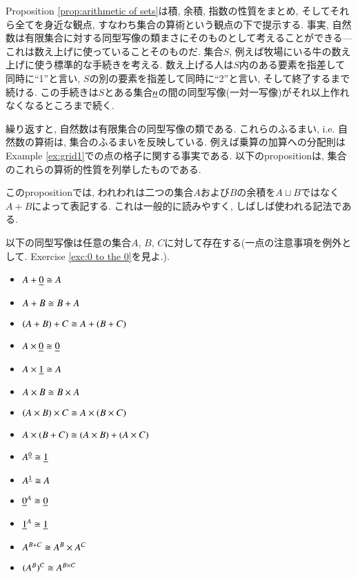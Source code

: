Proposition \ref{prop:arithmetic of sets}は積, 余積, 指数の性質をまとめ, そしてそれら全てを身近な観点, すなわち集合の算術という観点の下で提示する. 事実, 自然数は有限集合に対する同型写像の類まさにそのものとして考えることができる---これは数え上げに使っていることそのものだ. 集合$S$, 例えば牧場にいる牛の数え上げに使う標準的な手続きを考える. 数え上げる人は$S$内のある要素を指差して同時に``1''と言い, $S$の別の要素を指差して同時に``2''と言い, そして終了するまで続ける. この手続きは$S$とある集合$\underline{n}$の間の同型写像(一対一写像)がそれ以上作れなくなるところまで続く. 


繰り返すと, 自然数は有限集合の同型写像の類である. これらのふるまい, i.e. 自然数の算術は, 集合のふるまいを反映している. 例えば乗算の加算への分配則はExample \ref{ex:grid1}での点の格子に関する事実である. 以下のpropositionは, 集合のこれらの算術的性質を列挙したものである.


このpropositionでは, われわれは二つの集合$A$および$B$の余積を$A\sqcup B$ではなく$A+B$によって表記する. これは一般的に読みやすく, しばしば使われる記法である.

\begin{proposition}\label{prop:arithmetic of sets}

以下の同型写像は任意の集合$A$, $B$, $C$に対して存在する(一点の注意事項を例外として. Exercise \ref{exc:0 to the 0}を見よ.).
\begin{itemize}
\item $A+\underline{0}\cong A$
\item $A + B\cong B + A$
\item $(A + B) + C \cong A + (B + C)$
\item $A\times\underline{0}\cong\underline{0}$
\item $A\times\underline{1}\cong A$
\item $A\times B\cong B\times A$
\item $(A\times B)\times C \cong A\times (B\times C)$
\item $A\times(B+C)\cong (A\times B)+(A\times C)$
\item $A^{\underline{0}}\cong \underline{1}$
\item $A^{\underline{1}}\cong A$
\item $\underline{0}^A\cong\underline{0}$
\item $\underline{1}^A\cong\underline{1}$
\item $A^{B+C}\cong A^B\times A^C$
\item $(A^B)^C\cong A^{B\times C}$
\end{itemize}

\end{proposition}

